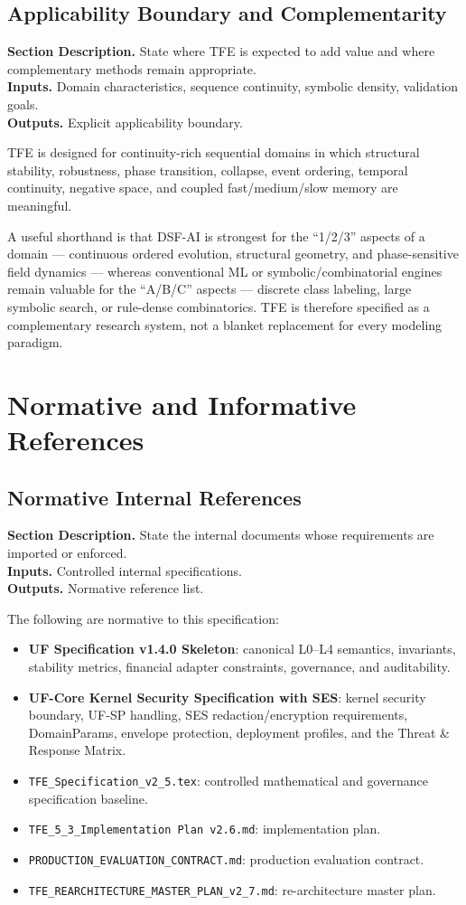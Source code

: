 \documentclass[11pt]{report}
\newcommand{\meta}[3]{\textbf{Section Description.} #1\\
\textbf{Inputs.} #2\\
\textbf{Outputs.} #3\par}
\begin{document}
\section{Applicability Boundary and Complementarity}
\meta{State where TFE is expected to add value and where complementary methods remain appropriate.}{Domain characteristics, sequence continuity, symbolic density, validation goals.}{Explicit applicability boundary.}

TFE is designed for continuity-rich sequential domains in which structural stability, robustness, phase transition, collapse, event ordering, temporal continuity, negative space, and coupled fast/medium/slow memory are meaningful.

A useful shorthand is that DSF-AI is strongest for the ``1/2/3'' aspects of a domain --- continuous ordered evolution, structural geometry, and phase-sensitive field dynamics --- whereas conventional ML or symbolic/combinatorial engines remain valuable for the ``A/B/C'' aspects --- discrete class labeling, large symbolic search, or rule-dense combinatorics. TFE is therefore specified as a complementary research system, not a blanket replacement for every modeling paradigm.

\chapter{Normative and Informative References}
\section{Normative Internal References}
\meta{State the internal documents whose requirements are imported or enforced.}{Controlled internal specifications.}{Normative reference list.}

The following are normative to this specification:
\begin{itemize}
    \item \textbf{UF Specification v1.4.0 Skeleton}: canonical L0--L4 semantics, invariants, stability metrics, financial adapter constraints, governance, and auditability.
    \item \textbf{UF-Core Kernel Security Specification with SES}: kernel security boundary, UF-SP handling, SES redaction/encryption requirements, DomainParams, envelope protection, deployment profiles, and the Threat \& Response Matrix.
    \item \texttt{TFE\_Specification\_v2\_5.tex}: controlled mathematical and governance specification baseline.
    \item \texttt{TFE\_5\_3\_Implementation Plan v2.6.md}: implementation plan.
    \item \texttt{PRODUCTION\_EVALUATION\_CONTRACT.md}: production evaluation contract.
    \item \texttt{TFE\_REARCHITECTURE\_MASTER\_PLAN\_v2\_7.md}: re-architecture master plan.
\end{itemize}
\end{document}
